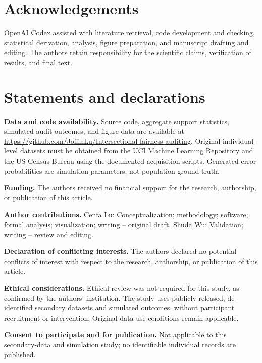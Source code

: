\documentclass[Afour,sageh,times,doublespace]{sagej}
\newif\ifreviewcopy
\begin{document}
\section*{Acknowledgements}
OpenAI Codex assisted with literature retrieval, code development and checking, statistical derivation, analysis, figure preparation, and manuscript drafting and editing. The authors retain responsibility for the scientific claims, verification of results, and final text.
\fi

\section*{Statements and declarations}
\ifreviewcopy
\textbf{Data and code availability.} The reproducibility repository is identified in the separate title page. It contains source code, aggregate support statistics, simulated audit outcomes, and figure data. Original individual-level public datasets must be obtained from their original providers. Generated error probabilities are simulation parameters, not population ground truth.
\else
\textbf{Data and code availability.} Source code, aggregate support statistics, simulated audit outcomes, and figure data are available at \url{https://github.com/JoffinLu/Intersectional-fairness-auditing}. Original individual-level datasets must be obtained from the UCI Machine Learning Repository and the US Census Bureau using the documented acquisition scripts. Generated error probabilities are simulation parameters, not population ground truth.
\fi

\textbf{Funding.} The authors received no financial support for the research, authorship, or publication of this article.

\ifreviewcopy\else
\textbf{Author contributions.} Cenfa Lu: Conceptualization; methodology; software; formal analysis; visualization; writing -- original draft. Shuda Wu: Validation; writing -- review and editing.
\fi

\textbf{Declaration of conflicting interests.} The authors declared no potential conflicts of interest with respect to the research, authorship, or publication of this article.

\textbf{Ethical considerations.} Ethical review was not required for this study, as confirmed by the authors' institution. The study uses publicly released, de-identified secondary datasets and simulated outcomes, without participant recruitment or intervention. Original data-use conditions remain applicable.

\textbf{Consent to participate and for publication.} Not applicable to this secondary-data and simulation study; no identifiable individual records are published.
\end{document}
